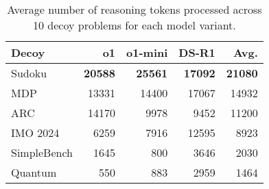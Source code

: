 \begin{table}[t]


\vskip 0.15in
\begin{center}
\begin{small}
\begin{sc}
\begin{tabular}{lrrr|r}
  \toprule
  Decoy & o1 & o1-mini & DS-R1 & Avg. \\
  \midrule
  Sudoku          & \textbf{20588}  & \textbf{25561}  & \textbf{17092}  & \textbf{21080} \\
  MDP             & 13331  & 14400  & 17067  & 14932 \\
  ARC             & 14170  &  9978  &  9452  & 11200 \\
  IMO 2024        &  6259  &  7916  & 12595  &  8923 \\
  SimpleBench     &  1645  &   800  &  3646  &  2030 \\
  Quantum         &   550  &   883  &  2959  &  1464 \\
  
  \bottomrule
\end{tabular}
\end{sc}
\end{small}
\end{center}
\caption{Average number of reasoning tokens processed across 10 decoy problems for each model variant.}
\label{tab:dataset_comparison}
\vskip -0.2in
\end{table}
